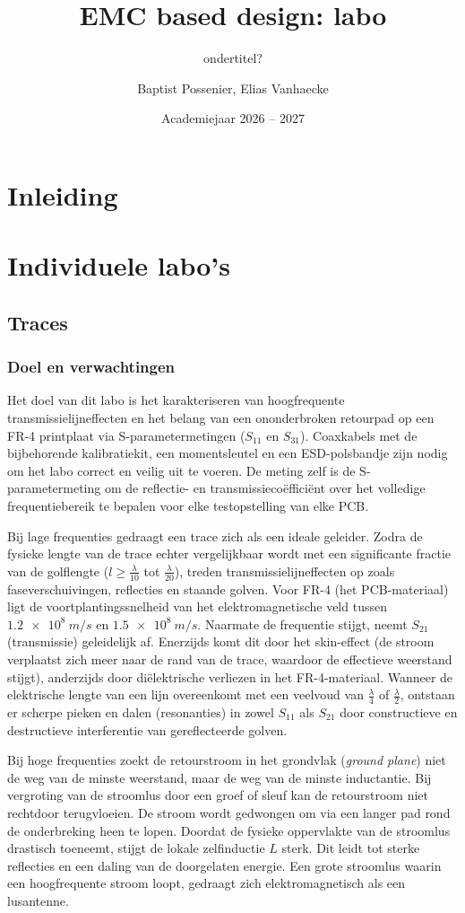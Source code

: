 \documentclass[twoside,kul]{kulakreport} %
\title{EMC based design: labo}
\subtitle{ondertitel?}
\author{Baptist Possenier, Elias Vanhaecke}
\date{Academiejaar 2026 -- 2027}
\institute{KU Leuven Brugge}
\begin{document}
	
	\titlepage
	\tableofcontents
	
	\chapter*{Inleiding}


	\chapter{Individuele labo's}

	\section{Traces}
	\subsection{Doel en verwachtingen}
	Het doel van dit labo is het karakteriseren van hoogfrequente transmissielijneffecten en het belang van een ononderbroken retourpad op een FR-4 printplaat via S-parametermetingen ($S_{11}$ en $S_{31}$). Coaxkabels met de bijbehorende kalibratiekit, een momentsleutel en een ESD-polsbandje zijn nodig om het labo correct en veilig uit te voeren. De meting zelf is de S-parametermeting om de reflectie- en transmissiecoëfficiënt over het volledige frequentiebereik te bepalen voor elke testopstelling van elke PCB.

	Bij lage frequenties gedraagt een trace zich als een ideale geleider. Zodra de fysieke lengte van de trace echter vergelijkbaar wordt met een significante fractie van de golflengte ($l \geq \frac{\lambda}{10}$ tot $\frac{\lambda}{20}$), treden transmissielijneffecten op zoals faseverschuivingen, reflecties en staande golven. Voor FR-4 (het PCB-materiaal) ligt de voortplantingssnelheid van het elektromagnetische veld tussen $\SI{1,2e8}{m/s}$ en $\SI{1,5e8}{m/s}$. Naarmate de frequentie stijgt, neemt $S_{21}$ (transmissie) geleidelijk af. Enerzijds komt dit door het skin-effect (de stroom verplaatst zich meer naar de rand van de trace, waardoor de effectieve weerstand stijgt), anderzijds door diëlektrische verliezen in het FR-4-materiaal. Wanneer de elektrische lengte van een lijn overeenkomt met een veelvoud van $\frac{\lambda}{4}$ of $\frac{\lambda}{2}$, ontstaan er scherpe pieken en dalen (resonanties) in zowel $S_{11}$ als $S_{21}$ door constructieve en destructieve interferentie van gereflecteerde golven.

	Bij hoge frequenties zoekt de retourstroom in het grondvlak (\textit{ground plane}) niet de weg van de minste weerstand, maar de weg van de minste inductantie. Bij vergroting van de stroomlus door een groef of sleuf kan de retourstroom niet rechtdoor terugvloeien. De stroom wordt gedwongen om via een langer pad rond de onderbreking heen te lopen. Doordat de fysieke oppervlakte van de stroomlus drastisch toeneemt, stijgt de lokale zelfinductie $L$ sterk. Dit leidt tot sterke reflecties en een daling van de doorgelaten energie. Een grote stroomlus waarin een hoogfrequente stroom loopt, gedraagt zich elektromagnetisch als een lusantenne.
\end{document}
